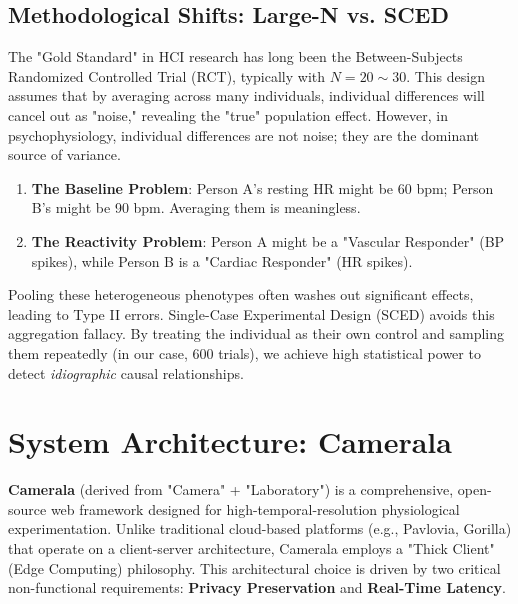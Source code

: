 \documentclass[journal]{IEEEtran}
\begin{document}
\subsection{Methodological Shifts: Large-N vs. SCED}
The "Gold Standard" in HCI research has long been the Between-Subjects Randomized Controlled Trial (RCT), typically with $N=20 \sim 30$. This design assumes that by averaging across many individuals, individual differences will cancel out as "noise," revealing the "true" population effect.
However, in psychophysiology, individual differences are not noise; they are the dominant source of variance.
\begin{enumerate}
    \item \textbf{The Baseline Problem}: Person A's resting HR might be 60 bpm; Person B's might be 90 bpm. Averaging them is meaningless.
    \item \textbf{The Reactivity Problem}: Person A might be a "Vascular Responder" (BP spikes), while Person B is a "Cardiac Responder" (HR spikes).
\end{enumerate}
Pooling these heterogeneous phenotypes often washes out significant effects, leading to Type II errors.
Single-Case Experimental Design (SCED) \cite{barlow_sced} avoids this aggregation fallacy. By treating the individual as their own control and sampling them repeatedly (in our case, 600 trials), we achieve high statistical power to detect \textit{idiographic} causal relationships.

\section{System Architecture: Camerala}
\textbf{Camerala} (derived from "Camera" + "Laboratory") is a comprehensive, open-source web framework designed for high-temporal-resolution physiological experimentation. Unlike traditional cloud-based platforms (e.g., Pavlovia, Gorilla) that operate on a client-server architecture, Camerala employs a "Thick Client" (Edge Computing) philosophy. This architectural choice is driven by two critical non-functional requirements: \textbf{Privacy Preservation} and \textbf{Real-Time Latency}.
\end{document}
